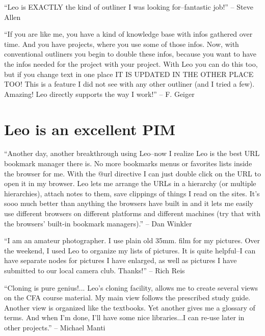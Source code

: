 \documentclass[a4paper,10pt,english]{sphinxmanual}
\begin{document}
``Leo is EXACTLY the kind of outliner I was looking for--fantastic job!''
-- Steve Allen

``If you are like me, you have a kind of knowledge base with infos gathered over
time. And you have projects, where you use some of those infos. Now, with
conventional outliners you begin to double these infos, because you want to have
the infos needed for the project with your project. With Leo you can do this
too, but if you change text in one place IT IS UPDATED IN THE OTHER PLACE TOO!
This is a feature I did not see with any other outliner (and I tried a few).
Amazing! Leo directly supports the way I work!'' -- F. Geiger


\section{Leo is an excellent PIM}
\label{testimonials:leo-is-an-excellent-pim}
``Another day, another breakthrough using Leo--now I realize Leo is the best URL
bookmark manager there is. No more bookmarks menus or favorites lists inside the
browser for me. With the @url directive I can just double click on the URL to
open it in my browser. Leo lets me arrange the URLs in a hierarchy (or multiple
hierarchies), attach notes to them, save clippings of things I read on the
sites. It's sooo much better than anything the browsers have built in and it
lets me easily use different browsers on different platforms and different
machines (try that with the browsers' built-in bookmark managers).'' -- Dan
Winkler

``I am an amateur photographer. I use plain old 35mm. film for my pictures. Over
the weekend, I used Leo to organize my lists of pictures. It is quite helpful--I
can have separate nodes for pictures I have enlarged, as well as pictures I have
submitted to our local camera club. Thanks!'' -- Rich Reis

``Cloning is pure genius!... Leo's cloning facility, allows me to create several
views on the CFA course material. My main view follows the prescribed study
guide. Another view is organized like the textbooks. Yet another gives me a
glossary of terms. And when I'm done, I'll have some nice libraries...I can
re-use later in other projects.'' -- Michael Manti
\end{document}
